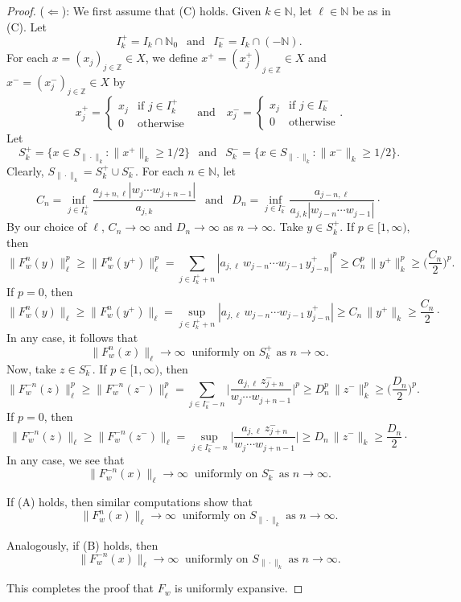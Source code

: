 \documentclass[10pt,a4paper]{amsart}
\newcommand{\N}{\mathbb{N}}   %
\newcommand{\Z}{\mathbb{Z}}   %
\begin{document}
\begin{proof}
\smallskip\noindent
($\Leftarrow$): We first assume that (C) holds. Given $k \in \N$, let $\ell \in \N$ be as in (C). Let 
\[
I_k^+ = I_k \cap \N_0 \ \ \text{ and } \ \ I_k^- = I_k \cap (-\N).
\]
For each $x = (x_j)_{j \in \Z} \in X$, we define $x^+ = (x^+_j)_{j \in \Z} \in X$ and $x^- = (x^-_j)_{j \in \Z} \in X$ by
\[
x^+_j = \left\{\begin{array}{cl} x_j & \text{if } j \in I_k^+\\ 0 & \text{otherwise} \end{array}\right. \ \ \text{ and } \ \ \
x^-_j = \left\{\begin{array}{cl} x_j & \text{if } j \in I_k^-\\ 0 & \text{otherwise} \end{array}\right..
\]
Let 
\[
S_k^+ = \{x \in S_{\|\cdot\|_k} : \|x^+\|_k \geq 1/2\} \ \ \text{ and } \ \ S_k^- = \{x \in S_{\|\cdot\|_k} : \|x^-\|_k \geq 1/2\}.
\]
Clearly, $S_{\|\cdot\|_k} = S_k^+ \cup S_k^-$. For each $n \in \N$, let
\[
C_n = \inf_{j \in I_k^+} \frac{a_{j+n,\ell} |w_j \cdots w_{j+n-1}|}{a_{j,k}} \ \ \text{ and } \ \
D_n = \inf_{j \in I_k^-} \frac{a_{j-n,\ell}}{a_{j,k} |w_{j-n} \cdots w_{j-1}|}\cdot
\]
By our choice of $\ell$, $C_n \to \infty$ and $D_n \to \infty$ as $n \to \infty$. Take $y \in S_k^+$. If $p \in [1,\infty)$, then
\[
\|F_w^n(y)\|_\ell^p \geq \|F_w^n(y^+)\|_\ell^p = \sum_{j \in I_k^+ + n} |a_{j,\ell}\, w_{j-n} \cdots w_{j-1}\, y^+_{j-n}|^p
  \geq C_n^p \, \|y^+\|_k^p \geq \Big(\frac{C_n}{2}\Big)^p.
\]
If $p = 0$, then
\[
\|F_w^n(y)\|_\ell \geq \|F_w^n(y^+)\|_\ell = \sup_{j \in I_k^+ + n} |a_{j,\ell}\, w_{j-n} \cdots w_{j-1}\, y^+_{j-n}|
  \geq C_n \, \|y^+\|_k \geq \frac{C_n}{2}\cdot
\]
In any case, it follows that 
\[
\|F_w^n(x)\|_\ell \to \infty \ \text{ uniformly on } S_k^+ \text{ as } n \to \infty.
\]
Now, take $z \in S_k^-$. If $p \in [1,\infty)$, then
\[
\|F_w^{-n}(z)\|_\ell^p \geq \|F_w^{-n}(z^-)\|_\ell^p 
  = \sum_{j \in I_k^- - n} \Big|\frac{a_{j,\ell}\, z^-_{j+n}}{w_j \cdots w_{j+n-1}}\Big|^p
  \geq D_n^p \, \|z^-\|_k^p \geq \Big(\frac{D_n}{2}\Big)^p.
\]
If $p = 0$, then
\[
\|F_w^{-n}(z)\|_\ell \geq \|F_w^{-n}(z^-)\|_\ell 
  = \sup_{j \in I_k^- - n} \Big|\frac{a_{j,\ell}\, z^-_{j+n}}{w_j \cdots w_{j+n-1}}\Big|
  \geq D_n \, \|z^-\|_k \geq \frac{D_n}{2}\cdot
\]
In any case, we see that 
\[
\|F_w^{-n}(x)\|_\ell \to \infty \ \text{ uniformly on } S_k^- \text{ as } n \to \infty.
\]

If (A) holds, then similar computations show that
\[
\|F_w^n(x)\|_\ell \to \infty \ \text{ uniformly on } S_{\|\cdot\|_k} \text{ as } n \to \infty.
\]

Analogously, if (B) holds, then
\[
\|F_w^{-n}(x)\|_\ell \to \infty \ \text{ uniformly on } S_{\|\cdot\|_k} \text{ as } n \to \infty.
\]

This completes the proof that $F_w$ is uniformly expansive.
\end{proof}
\end{document}
